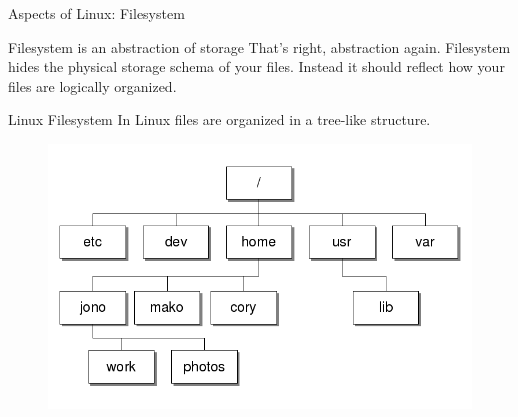\begin{frame}{Aspects of Linux: Filesystem}
\begin{block}{Filesystem is an abstraction of storage}
	That's right, abstraction again. Filesystem hides the physical storage schema of your files. Instead it should reflect how your files are logically organized.
\end{block}
\begin{block}{Linux Filesystem}
	In Linux files are organized in a tree-like structure.
	\begin{figure}
		\vspace{-0.2in}
		\centering
		\includegraphics[scale=0.5]{fig/rc2_linuxfs}
		\label{something}
	\end{figure}
\end{block}
\end{frame}

